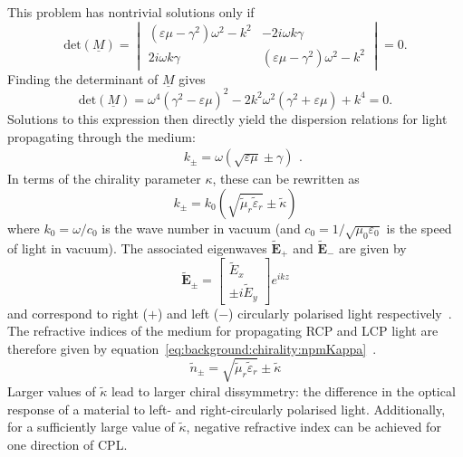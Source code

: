 This problem has nontrivial solutions only if 
\begin{equation}
    \mathrm{det}(\underline{M}) = 
    \begin{vmatrix}
        (\varepsilon \mu - \gamma^2)\omega^2 -k^2  & -2 i \omega k \gamma \\ 
		2 i \omega k \gamma & (\varepsilon \mu - \gamma^2)\omega^2 -k^2
    \end{vmatrix}    
    = 0.
\end{equation}
Finding the determinant of $\underline{M}$ gives
\begin{equation}
    \mathrm{det}(\underline{M}) = 
    \omega^4 (\gamma^2 - \varepsilon \mu)^2 - 2 k^2 \omega^2 (\gamma^2 + \varepsilon \mu) + k^4
    = 0.
\end{equation}
Solutions to this expression then directly yield the dispersion relations for light propagating through the medium:
\begin{equation}
    \begin{split}
        & k_{\pm} = \omega (\sqrt{\varepsilon \mu} \pm \gamma)
    \end{split}.
\end{equation}
In terms of the chirality parameter $\kappa$, these can be rewritten as
\begin{equation}\label{eq:background:chirality:kpmKappa}
    {k_\pm } = {k_0}\left( \sqrt {\tilde \mu_r \tilde \varepsilon_r} \pm \tilde \kappa  \right)
\end{equation}
where $k_0=\omega / c_0$ is the wave number in vacuum (and $c_0=1/\sqrt {{\mu _0}{\varepsilon _0}}$ is the speed of light in vacuum). The associated eigenwaves $\mathbf{\tilde E}_+$ and $\mathbf{\tilde E}_-$ are given by
\begin{equation}
    \mathbf{\tilde E}_{\pm} = \begin{bmatrix}\tilde E_x\\ \pm i \tilde E_y\end{bmatrix} e^{i k z}
\end{equation}
and correspond to right ($+$) and left ($-$) circularly polarised light respectively~\cite[\S 2.2]{Lekner1999}\cite{Chern2013}.
The refractive indices of the medium for propagating RCP and LCP light are therefore given by equation~\ref{eq:background:chirality:npmKappa}~\cite{Capolino2009, Qiu2008, Valev2013b}. 
\begin{equation}\label{eq:background:chirality:npmKappa}
    {\tilde n_ \pm } = \sqrt {\tilde \mu_r \tilde \varepsilon_r}  \pm \tilde \kappa
\end{equation}
Larger values of $\tilde \kappa$ lead to larger chiral dissymmetry: the difference in the optical response of a material to left- and right-circularly polarised light.
Additionally, for a sufficiently large value of $\tilde \kappa$, negative refractive index can be achieved for one direction of CPL.

